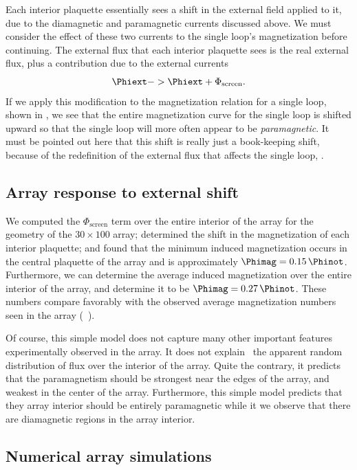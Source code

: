 Each interior plaquette essentially sees a shift in the external field
applied to it, due to the diamagnetic and paramagnetic currents
discussed above. 
We must consider the effect of these two currents to the 
single loop's magnetization before continuing. The external flux
that each interior plaquette sees is the real external flux, 
plus a contribution due to the external currents
%
\begin{equation}
\Phiext -> \Phiext + \Phi_{\mathrm{screen}}.
\label{eqn:ext_flux_redef}
\end{equation}
%
If we apply this modification to the magnetization relation for a 
single loop, shown in , we see that the
entire magnetization curve for the single loop is shifted upward
so that the single loop will more often appear to be 
\emph{paramagnetic}. It must be pointed out here that this 
shift is really just a book-keeping shift, because of the 
redefinition of the external flux that affects the single 
loop, . 

\subsection{Array response to external shift}

We computed the $\Phi_{\mathrm{screen}}$ term
over the entire interior of the array
for the geometry of the $30 \times 100$ array;
determined the shift in the magnetization of each interior
plaquette; and found that the 
minimum induced magnetization occurs in the central plaquette of
the array and is approximately $\Phimag=0.15\,\Phinot$. Furthermore,
we can determine the average induced magnetization over the 
entire interior of the array, and determine it to be 
$\Phimag=0.27\,\Phinot$. These numbers compare favorably with the observed
average
magnetization numbers seen in the array (\cf\ ).

Of course, this simple model does not capture many other important
features experimentally observed in the array. It does not explain
\eg\ the apparent random distribution of flux over the interior of the
array. Quite the contrary, it predicts that the paramagnetism should
be strongest near the edges of the array, and weakest in the center
of the array. Furthermore, this simple model predicts that they array
interior
should be entirely paramagnetic while it we observe that there
are diamagnetic regions in the array interior. 

\subsection{Numerical array simulations}
\label{sec:num_array_sims}

